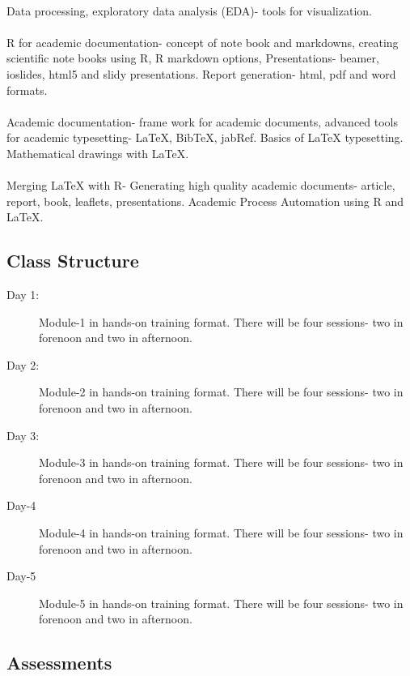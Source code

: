 \documentclass[11pt]{article}
\begin{document}
\\
Data processing, exploratory data analysis (EDA)- tools for visualization.\\

\\
R for academic documentation- concept of note book and markdowns, creating scientific note books using R, R markdown options, Presentations- beamer, ioslides, html5 and  slidy presentations. Report generation- html, pdf and word formats.\\

\\
Academic documentation- frame work for academic documents, advanced tools for academic typesetting- \LaTeX{}, BibTeX, jabRef. Basics of \LaTeX{} typesetting. Mathematical drawings with \LaTeX{}.\\

\\
  Merging \LaTeX{} with R- Generating high quality academic documents- article, report, book, leaflets, presentations. Academic Process Automation using R and \LaTeX{}.
\subsection*{Class Structure}


\bigskip

\begin{description}
\item[Day 1:] Module-1 in hands-on training format. There will be four sessions- two in forenoon and two in afternoon.
\item[Day 2:] Module-2 in hands-on training format. There will be four sessions- two in forenoon and two in afternoon.
\item[Day 3:] Module-3 in hands-on training format. There will be four sessions- two in forenoon and two in afternoon.
\item[Day-4]Module-4 in hands-on training format. There will be four sessions- two in forenoon and two in afternoon.
\item[Day-5] Module-5 in hands-on training format. There will be four sessions- two in forenoon and two in afternoon.
\end{description}

\subsection*{Assessments}
\end{document}
